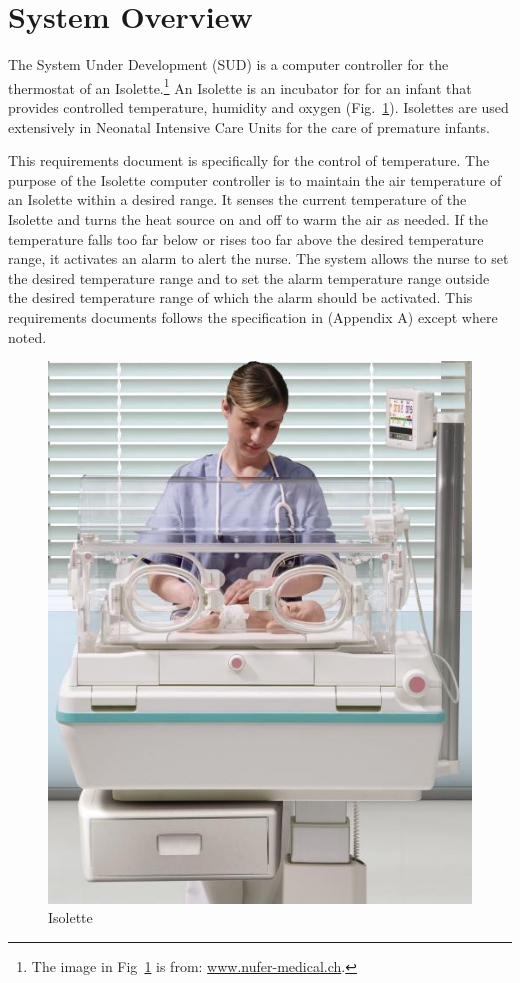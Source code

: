 \documentclass[fontsize=12pt,paper=letter,twoside]{scrartcl}
\begin{document}
\newpage

\tableofcontents
\listoffigures
\listoftables
\newpage


\section{System Overview}

The System Under Development (SUD) is a computer controller for the thermostat of an Isolette.\footnote{%
The image in Fig~\ref{fig:isolette} is from: \url{www.nufer-medical.ch}.}
An Isolette is an incubator for for an infant that provides controlled temperature, humidity and oxygen (Fig.~\ref{fig:isolette}). Isolettes are used extensively in Neonatal Intensive Care Units for the care of premature infants.

This requirements document is specifically for the control of temperature. The purpose of the Isolette computer controller is to maintain the air temperature of an Isolette within a desired range. It senses the current temperature of the Isolette and turns the heat source on and off to warm the air as needed. If the temperature falls too far below or rises too far above the desired temperature range, it activates an alarm to alert the nurse. The system allows the nurse to set the desired temperature range and to set the alarm temperature range outside the desired temperature range of which the alarm should be activated. This requirements documents follows the specification in \cite{REMH} (Appendix A) except where noted.

\begin{figure}[!htb]
\begin{center}
\includegraphics[width=.4\textwidth]{images/isolette.png}
\end{center}
\caption{Isolette}
\label{fig:isolette}
\end{figure}
\end{document}
